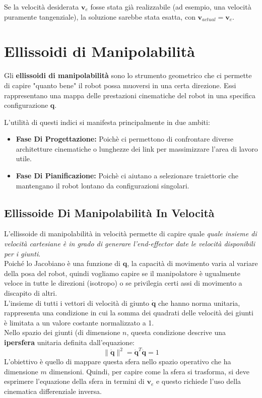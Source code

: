 ﻿\documentclass[11pt, a4paper]{article}
\begin{document}
Se la velocità desiderata $\bm{v}_e$ fosse stata già realizzabile (ad esempio, una velocità puramente tangenziale), la soluzione sarebbe stata esatta, con $\bm{v}_{actual} = \bm{v}_e$.

\newpage
\section{Ellissoidi di Manipolabilità}
Gli \textbf{ellissoidi di manipolabilità} sono lo strumento geometrico che ci permette di capire "quanto bene" il robot possa muoversi in una certa direzione. Essi rappresentano una mappa delle prestazioni cinematiche del robot in una specifica configurazione $\bm{q}$.

L'utilità di questi indici si manifesta principalmente in due ambiti:
\begin{itemize}
    \item \textbf{Fase Di Progettazione:} Poichè ci permettono di confrontare diverse architetture cinematiche o lunghezze dei link per massimizzare l'area di lavoro utile.
    \item \textbf{Fase Di Pianificazione:} Poichè ci aiutano a selezionare traiettorie che mantengano il robot lontano da configurazioni singolari.
\end{itemize}

\subsection{Ellissoide Di Manipolabilità In Velocità}
L'ellissoide di manipolabilità in velocità permette di capire quale \emph{quale insieme di velocità cartesiane è in grado di generare l'end-effector date le velocità disponibili per i giunti}. \\
Poiché lo Jacobiano è una funzione di $\bm{q}$, la capacità di movimento varia al variare della posa del robot, quindi vogliamo capire se il manipolatore è ugualmente veloce in tutte le direzioni (isotropo) o se privilegia certi assi di movimento a discapito di altri.\\
L'insieme di tutti i vettori di velocità di giunto $\dot{\bm{q}}$ che hanno norma unitaria, rappresenta una condizione in cui la somma dei quadrati delle velocità dei giunti è limitata a un valore costante normalizzato a 1.\\
Nello spazio dei giunti (di dimensione \(n\), questa condizione descrive una \textbf{ipersfera} unitaria definita dall'equazione:
\[
    \|\dot{\bm{q}}\|^2 = \dot{\bm{q}}^T\dot{\bm{q}} = 1
\]
L'obiettivo è quello di mappare questa sfera nello spazio operativo che ha dimensione $m$ dimensioni. Quindi, per capire come la sfera si trasforma, si deve esprimere l'equazione della sfera in termini di $\bm{v}_e$ e questo richiede l'uso della cinematica differenziale inversa.
\end{document}
